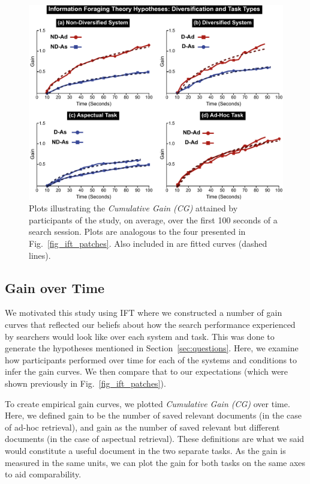 \begin{figure}[t!]
\includegraphics[width=\textwidth]{figures/cg-fromthesis.pdf}
\caption{Plots illustrating the \emph{Cumulative Gain (CG)} attained by participants of the study, on average, over the first 100 seconds of a search session. Plots are analogous to the four presented in Fig.~\ref{fig_ift_patches}. Also included in are fitted curves (dashed lines).} \label{fig_cg}
\end{figure}

\subsection{Gain over Time}
We motivated this study using IFT where we constructed a number of gain curves that reflected our beliefs about how the search performance experienced by searchers would look like over each system and task. This was done to generate the hypotheses mentioned in Section~\ref{sec:questions}. Here, we examine how participants performed over time for each of the systems and conditions to infer the gain curves. We then compare that to our expectations (which were shown previously in Fig.~\ref{fig_ift_patches}).

To create empirical gain curves, we plotted \emph{Cumulative Gain (CG)} over time. Here, we defined gain to be the number of saved relevant documents (in the case of ad-hoc retrieval), and gain as the number of saved relevant but different documents (in the case of aspectual retrieval). These definitions are what we said would constitute a useful document in the two separate tasks. As the gain is measured in the same units, we can plot the gain for both tasks on the same axes to aid comparability.

